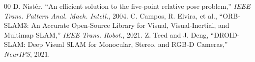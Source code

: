 \documentclass[conference]{IEEEtran}
\begin{document}
\begin{thebibliography}{00}
 D. Nist{\'e}r, ``An efficient solution to the five-point relative pose problem,'' \textit{IEEE Trans. Pattern Anal. Mach. Intell.}, 2004.
 C. Campos, R. Elvira, et al., ``ORB-SLAM3: An Accurate Open-Source Library for Visual, Visual-Inertial, and Multimap SLAM,'' \textit{IEEE Trans. Robot.}, 2021.
 Z. Teed and J. Deng, ``DROID-SLAM: Deep Visual SLAM for Monocular, Stereo, and RGB-D Cameras,'' \textit{NeurIPS}, 2021.
\end{thebibliography}
\end{document}
